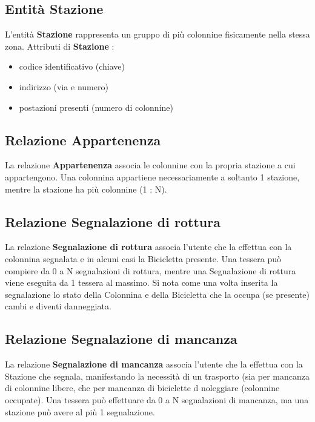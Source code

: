 \documentclass[a4paper,twoside]{article}
\begin{document}
\subsection{Entità Stazione}
L'entità \textbf{Stazione} rappresenta un gruppo di più colonnine fisicamente nella stessa zona.\newline
Attributi di \textbf{Stazione} :
\begin{itemize}
 \item codice identificativo (chiave)
 \item indirizzo (via e numero)
 \item postazioni presenti (numero di colonnine)
 \end{itemize}

\subsection{Relazione Appartenenza}
La relazione \textbf{Appartenenza} associa le colonnine con la propria stazione a cui appartengono.\newline
Una colonnina appartiene necessariamente a soltanto 1 stazione, mentre la stazione ha più colonnine (1 : N).

\subsection{Relazione Segnalazione di rottura}
La relazione \textbf{Segnalazione di rottura} associa l'utente che la effettua con la colonnina segnalata e in alcuni casi la Bicicletta presente.\newline
Una tessera può compiere da 0 a N segnalazioni di rottura, mentre una Segnalazione di rottura viene eseguita da 1 tessera al massimo.\newline
Si nota come una volta inserita la segnalazione lo stato della Colonnina e della Bicicletta che la occupa (se presente) cambi e diventi danneggiata.

\subsection{Relazione Segnalazione di mancanza}
La relazione \textbf{Segnalazione di mancanza} associa l'utente che la effettua con la Stazione che segnala, manifestando la necessità di un trasporto (sia per mancanza di colonnine libere, che per mancanza di biciclette d noleggiare (colonnine occupate).\newline
Una tessera può effettuare da 0 a N segnalazioni di mancanza, ma una stazione può avere al più 1 segnalazione.
\end{document}
